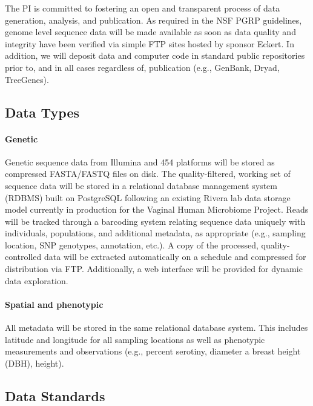 \newpage


The PI is committed to fostering an open and transparent process of data generation, 
analysis, and publication. As required in the NSF PGRP guidelines, genome level sequence data will be made 
available as soon as data quality and integrity have been verified via simple FTP sites hosted by sponsor Eckert. 
In addition, we will deposit data and computer code in standard public repositories prior to, and in all cases 
regardless of, publication (e.g., GenBank, Dryad, TreeGenes).

\subsection*{Data Types}

\paragraph{Genetic}
Genetic sequence data from Illumina and 454 platforms will be stored as compressed FASTA/FASTQ files 
on disk. The quality-filtered, working set of sequence data will be stored in a relational database management system 
(RDBMS) built on PostgreSQL following an existing Rivera lab data storage model currently in production 
for the Vaginal Human Microbiome Project. Reads will be tracked through a barcoding system relating 
sequence data uniquely with individuals, populations, and additional metadata, as appropriate (e.g., sampling 
location, SNP genotypes, annotation, etc.).  A copy of the processed, quality-controlled data will be extracted 
automatically on a schedule and compressed for distribution via FTP.  Additionally, a web interface will be provided for 
dynamic data exploration.

\paragraph{Spatial and phenotypic}
All metadata will be stored in the same relational database system.  This includes latitude and longitude for all sampling
locations as well as phenotypic measurements and observations (e.g., percent serotiny, diameter a breast height (DBH), 
height).

\subsection*{Data Standards}

